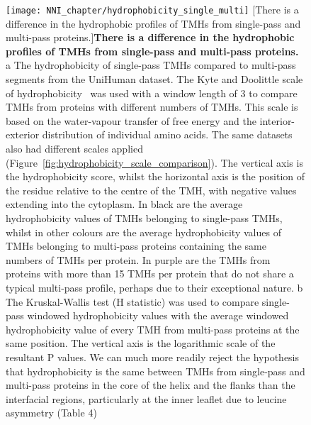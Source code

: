 \begin{figure}[!ht]
\centering
\texttt{[image: NNI\_chapter/hydrophobicity\_single\_multi]}
[There is a difference in the hydrophobic profiles of TMHs from single-pass and multi-pass proteins.]{\textbf{There is a difference in the hydrophobic profiles of TMHs from single-pass and multi-pass proteins.}
 a The hydrophobicity of single-pass TMHs compared to multi-pass segments from the UniHuman dataset.
The Kyte and Doolittle scale of hydrophobicity~\cite{Kyte1982} was used with a window length of 3 to compare TMHs from proteins with different numbers of TMHs.
This scale is based on the water-vapour transfer of free energy and the interior-exterior distribution of individual amino acids.
The same datasets also had different scales applied (Figure~\ref{fig:hydrophobicity_scale_comparison}).
The vertical axis is the hydrophobicity score, whilst the horizontal axis is the position of the residue relative to the centre of the TMH, with negative values extending into the cytoplasm.
In black are the average hydrophobicity values of TMHs belonging to single-pass TMHs, whilst in other colours are the average hydrophobicity values of TMHs belonging to multi-pass proteins containing the same numbers of TMHs per protein.
In purple are the TMHs from proteins with more than 15 TMHs per protein that do not share a typical multi-pass profile, perhaps due to their exceptional nature.
b The Kruskal-Wallis test (H statistic) was used to compare single-pass windowed hydrophobicity values with the average windowed hydrophobicity value of every TMH from multi-pass proteins at the same position.
The vertical axis is the logarithmic scale of the resultant P values.
We can much more readily reject the hypothesis that hydrophobicity is the same between TMHs from single-pass and multi-pass proteins in the core of the helix and the flanks than the interfacial regions, particularly at the inner leaflet due to leucine asymmetry (Table 4)}

\label{fig:hydrophobicity_single_multi}
\end{figure}

